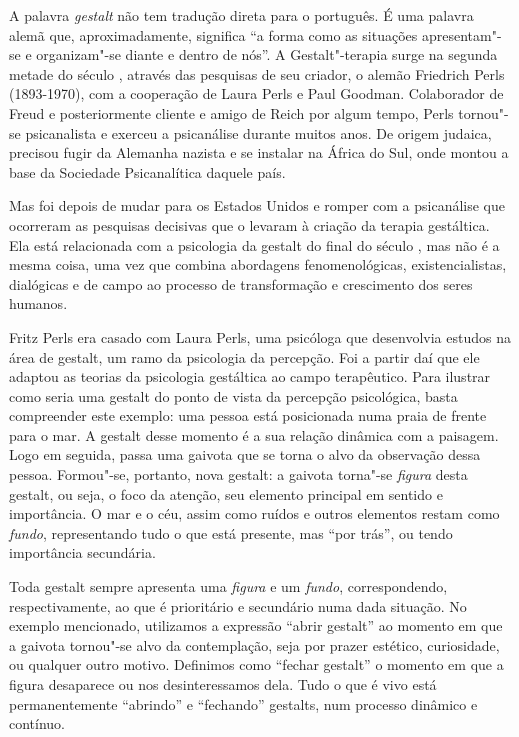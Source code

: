 A palavra \emph{gestalt} não tem tradução direta para o português. É uma
palavra alemã que, aproximadamente, significa ``a forma como as
situações apresentam"-se e organizam"-se diante e dentro de nós''. A
Gestalt"-terapia surge na segunda metade do século , através das
pesquisas de seu criador, o alemão Friedrich Perls (1893-1970), com a
cooperação de Laura Perls e Paul Goodman. Colaborador de Freud e posteriormente cliente e amigo de Reich
por algum tempo, Perls tornou"-se psicanalista e exerceu a psicanálise
durante muitos anos. De origem judaica, precisou fugir da Alemanha
nazista e se instalar na África do Sul, onde montou a base da Sociedade
Psicanalítica daquele país.

Mas foi depois de mudar para os Estados Unidos e romper com a
psicanálise que ocorreram as pesquisas decisivas que o levaram à criação
da terapia gestáltica. Ela está relacionada com a psicologia da gestalt do final do século , mas não é a mesma coisa, uma vez que combina abordagens fenomenológicas, existencialistas, dialógicas e de campo ao processo de transformação e crescimento dos seres humanos.

Fritz Perls era casado com Laura Perls, uma psicóloga que desenvolvia estudos na área de gestalt, um
ramo da psicologia da percepção. Foi a partir daí que ele adaptou as
teorias da psicologia gestáltica ao campo terapêutico. Para ilustrar
como seria uma gestalt do ponto de vista da percepção psicológica, basta
compreender este exemplo: uma pessoa está posicionada numa praia de
frente para o mar. A gestalt desse momento é a sua relação dinâmica com
a paisagem. Logo em seguida, passa uma gaivota que se torna o alvo da
observação dessa pessoa. Formou"-se, portanto, nova gestalt: a gaivota
torna"-se \emph{figura} desta gestalt, ou seja, o foco da atenção, seu
elemento principal em sentido e importância. O mar e o céu, assim como
ruídos e outros elementos restam como \emph{fundo}, representando tudo o
que está presente, mas ``por trás'', ou tendo importância secundária.

Toda gestalt sempre apresenta uma \emph{figura} e um \emph{fundo},
correspondendo, respectivamente, ao que é prioritário e secundário numa
dada situação. No exemplo mencionado, utilizamos a expressão ``abrir
gestalt'' ao momento em que a gaivota tornou"-se alvo da contemplação,
seja por prazer estético, curiosidade, ou qualquer outro motivo.
Definimos como ``fechar gestalt'' o momento em que a figura desaparece
ou nos desinteressamos dela. Tudo o que é vivo está permanentemente
``abrindo'' e ``fechando'' gestalts, num processo dinâmico e contínuo.

